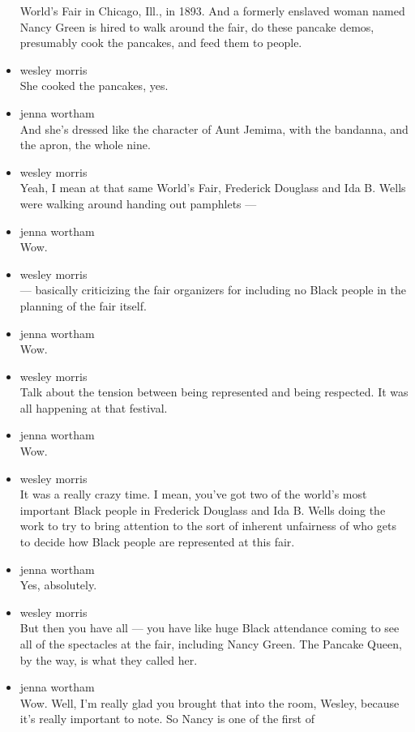 \begin{itemize}
  World's Fair in Chicago, Ill., in 1893. And a formerly enslaved woman
  named Nancy Green is hired to walk around the fair, do these pancake
  demos, presumably cook the pancakes, and feed them to people.
\item
  wesley morris\\
  She cooked the pancakes, yes.
\item
  jenna wortham\\
  And she's dressed like the character of Aunt Jemima, with the
  bandanna, and the apron, the whole nine.
\item
  wesley morris\\
  Yeah, I mean at that same World's Fair, Frederick Douglass and Ida B.
  Wells were walking around handing out pamphlets ---
\item
  jenna wortham\\
  Wow.
\item
  wesley morris\\
  --- basically criticizing the fair organizers for including no Black
  people in the planning of the fair itself.
\item
  jenna wortham\\
  Wow.
\item
  wesley morris\\
  Talk about the tension between being represented and being respected.
  It was all happening at that festival.
\item
  jenna wortham\\
  Wow.
\item
  wesley morris\\
  It was a really crazy time. I mean, you've got two of the world's most
  important Black people in Frederick Douglass and Ida B. Wells doing
  the work to try to bring attention to the sort of inherent unfairness
  of who gets to decide how Black people are represented at this fair.
\item
  jenna wortham\\
  Yes, absolutely.
\item
  wesley morris\\
  But then you have all --- you have like huge Black attendance coming
  to see all of the spectacles at the fair, including Nancy Green. The
  Pancake Queen, by the way, is what they called her.
\item
  jenna wortham\\
  Wow. Well, I'm really glad you brought that into the room, Wesley,
  because it's really important to note. So Nancy is one of the first of

\end{itemize}
